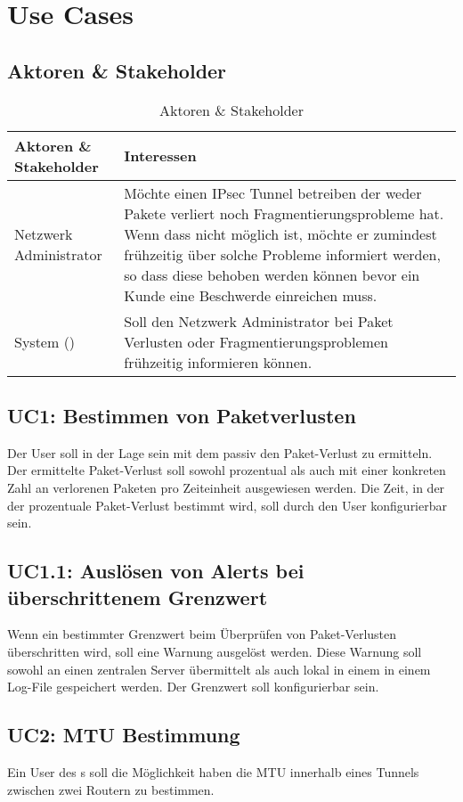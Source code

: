 \section{Use Cases}
\label{sec:Use Cases}

\subsection{Aktoren \& Stakeholder}

\begin{table}[H]
\begin{tabularx}{\textwidth}{l|>{\raggedright\arraybackslash}X} 
\textbf{Aktoren \& Stakeholder} & \textbf{Interessen}\\
\hline
Netzwerk Administrator & Möchte einen \ac{IPsec} Tunnel betreiben der weder Pakete verliert noch Fragmentierungsprobleme hat. Wenn dass nicht möglich ist, möchte er zumindest frühzeitig über solche Probleme informiert werden, so dass diese behoben werden können bevor ein Kunde eine Beschwerde einreichen muss.\\
System (\tool{}) & Soll den Netzwerk Administrator bei Paket Verlusten oder Fragmentierungsproblemen frühzeitig informieren können. \\
\end{tabularx}
\caption{Aktoren \& Stakeholder}
\end{table}

\subsection{UC1: Bestimmen von Paketverlusten}
Der User soll in der Lage sein mit dem \tool{} passiv den Paket-Verlust zu ermitteln. Der ermittelte Paket-Verlust soll sowohl prozentual als auch mit einer konkreten Zahl an verlorenen Paketen pro Zeiteinheit ausgewiesen werden. Die Zeit, in der der prozentuale Paket-Verlust bestimmt wird, soll durch den User konfigurierbar sein.

\subsection{UC1.1: Auslösen von Alerts bei überschrittenem Grenzwert}
Wenn ein bestimmter Grenzwert beim Überprüfen von Paket-Verlusten überschritten wird, soll eine Warnung ausgelöst werden. Diese Warnung soll sowohl an einen zentralen Server übermittelt als auch lokal in einem in einem Log-File gespeichert werden. Der Grenzwert soll konfigurierbar sein.

\subsection{UC2: MTU Bestimmung}
Ein User des \tool{}s soll die Möglichkeit haben die \ac{MTU} innerhalb eines Tunnels zwischen zwei Routern zu bestimmen.

